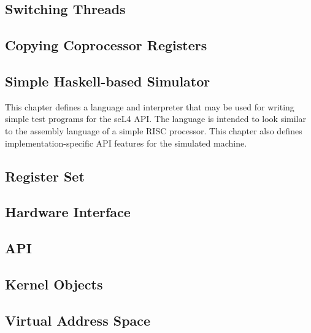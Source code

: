 \documentclass[a4paper,11pt,twoside]{report}
\begin{document}
\section{Switching Threads}


\section{Copying Coprocessor Registers}


\begin{impdetails}

\chapter{Simple Haskell-based Simulator}

This chapter defines a language and interpreter that may be used for writing simple test programs for the seL4 API. The language is intended to look similar to the assembly language of a simple RISC processor. This chapter also defines implementation-specific API features for the simulated machine.

\section{Register Set}


\section{Hardware Interface}


\section{API}


\section{Kernel Objects}


\section{Virtual Address Space}


\end{impdetails}



\end{document}
